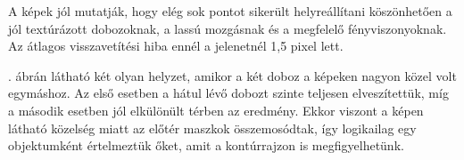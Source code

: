 A képek jól mutatják, hogy elég sok pontot sikerült helyreállítani köszönhetően a jól textúrázott dobozoknak, a lassú mozgásnak és a megfelelő fényviszonyoknak. Az átlagos visszavetítési hiba ennél a jelenetnél 1,5 pixel lett.

. ábrán látható két olyan helyzet, amikor a két doboz a képeken nagyon közel volt egymáshoz. Az első esetben a hátul lévő dobozt szinte teljesen elveszítettük, míg a második esetben jól elkülönült térben az eredmény. Ekkor viszont a képen látható közelség miatt az előtér maszkok összemosódtak, így logikailag egy objektumként értelmeztük őket, amit a kontúrrajzon is megfigyelhetünk.

\begin{figure}
\centering
{}
\end{figure}

